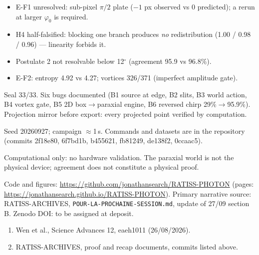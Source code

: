 \documentclass[10pt]{article}
\begin{document}
\begin{itemize}
  \item E-F1 unresolved: sub-pixel $\pi/2$ plate ($-1$ px observed vs 0 predicted);
        a rerun at larger $\varphi_0$ is required.
  \item H4 half-falsified: blocking one branch produces \emph{no} redistribution
        (1.00 / 0.98 / 0.96) --- linearity forbids it.
  \item Postulate 2 not resolvable below 12$^\circ$ (agreement 95.9 vs 96.8\%).
  \item E-F2: entropy 4.92 vs 4.27; vortices 326/371 (imperfect amplitude gate).
\end{itemize}

Seal 33/33. Six bugs documented (B1 source at edge, B2 slits, B3 world action,
B4 vortex gate, B5 2D box$\rightarrow$paraxial engine, B6 reversed chirp 29\%$\rightarrow$95.9\%).
Projection mirror before export: every projected point verified by computation.

Seed 20260927; campaign $\approx$1\,s. Commands and datasets are in the repository
(commits 2f18e80, 6f7bd1b, b455621, fb81249, de138f2, 0ccaac5).

Computational only: no hardware validation. The paraxial world is not the physical
device; agreement does not constitute a physical proof.

Code and figures: \url{https://github.com/jonathansearch/RATISS-PHOTON}
(pages: \url{https://jonathansearch.github.io/RATISS-PHOTON}).
Primary narrative source: RATISS-ARCHIVES, \texttt{POUR-LA-PROCHAINE-SESSION.md},
update of 27/09 section B. Zenodo DOI: to be assigned at deposit.

\begin{enumerate}
  \item Wen et al., Science Advances 12, eaeh1011 (26/08/2026).
  \item RATISS-ARCHIVES, proof and recap documents, commits listed above.
\end{enumerate}

\sourcefoot
\end{document}
